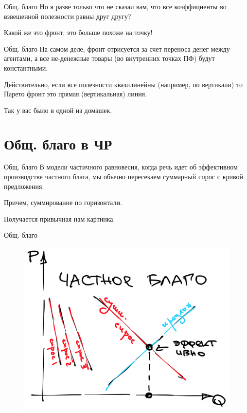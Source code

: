 \documentclass{beamer}
\begin{document}
\begin{frame}{Общ. благо}
Но я разве только что не сказал вам, что все коэффициенты во взвешенной полезности равны друг другу?

Какой же это фронт, это больше похоже на точку!
\end{frame}

\begin{frame}{Общ. благо}
На самом деле, фронт отрисуется за счет переноса денег между агентами, а все не-денежные товары (во внутренних точках ПФ) будут константными.

Действительно, если все полезности квазилинейны (например, по вертикали) то Парето фронт это прямая (вертикальная) линия.

Так у вас было в одной из домашек.
\end{frame}

\section{Общ. благо в ЧР}

\begin{frame}{Общ. благо}
В модели частичного равновесия, когда речь идет об эффективном производстве \alert{частного блага}, мы обычно пересекаем суммарный спрос с кривой предложения.

Причем, \alert{суммирование по горизонтали}.

Получается привычная нам картинка.
\end{frame}

\begin{frame}{Общ. благо}
\begin{figure}[hbt]
\centering
\includegraphics[width=.9 \textwidth]{private.png}
\end{figure}
\end{frame}
\end{document}
